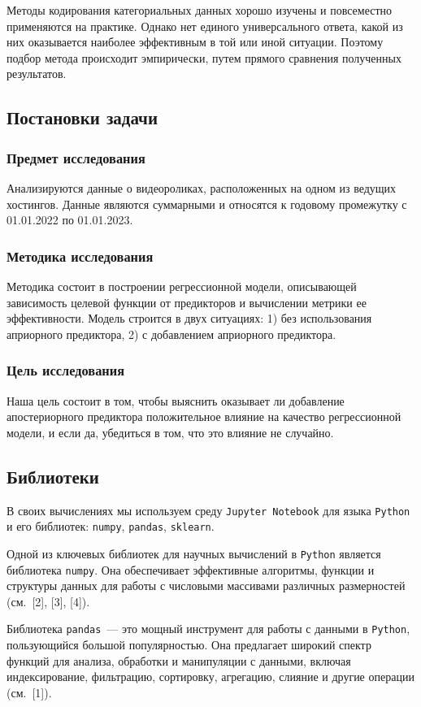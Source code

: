 \documentclass[a4paper,12pt]{article}
\begin{document}
\medskip

Методы кодирования категориальных данных хорошо изучены и повсеместно применяются на практике. Однако нет единого универсального ответа, какой из них оказывается наиболее эффективным в той или иной ситуации. Поэтому подбор метода происходит эмпирически, путем прямого сравнения полученных результатов.

\subsection{Постановки задачи}

\subsubsection{Предмет исследования} Анализируются данные о видеороликах, расположенных на одном из ведущих хостингов. Данные являются суммарными и относятся к годовому промежутку с 01.01.2022 по 01.01.2023. 
\subsubsection{Методика исследования} Методика состоит в построении регрессионной модели, описывающей зависимость целевой функции от предикторов и вычислении метрики ее эффективности. Модель строится в двух ситуациях: 1) без использования априорного предиктора, 2) с добавлением априорного предиктора.
\subsubsection{Цель исследования} Наша цель состоит в том, чтобы выяснить оказывает ли добавление апостериорного предиктора положительное влияние на качество регрессионной модели, и если да, убедиться в том, что это влияние не случайно.
\subsection{Библиотеки}
В своих вычислениях мы используем среду \texttt{Jupyter Notebook} для языка \texttt{Python} и  его библиотек: \texttt{numpy}, \texttt{pandas}, \texttt{sklearn}.

Одной из ключевых библиотек для научных вычислений в \texttt{Python} является библиотека \texttt{numpy}. Она обеспечивает эффективные алгоритмы, функции и структуры данных для работы с числовыми массивами различных размерностей (см. [2], [3], [4]).

Библиотека \texttt{pandas}~--- это мощный инструмент для работы с данными в \texttt{Python}, пользующийся большой популярностью. Она предлагает широкий спектр функций для анализа, обработки и манипуляции с данными, включая индексирование, фильтрацию, сортировку, агрегацию, слияние и другие операции (см. [1]).
\end{document}
